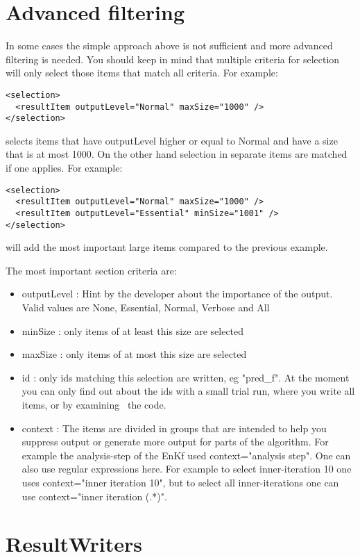 \section{Advanced filtering}

In some cases the simple approach above is not sufficient and more advanced
filtering is needed. You should keep in mind that multiple criteria for
selection will only select those items that match all criteria. For example:
\begin{verbatim}
<selection>
  <resultItem outputLevel="Normal" maxSize="1000" />
</selection>
\end{verbatim}
selects items that have outputLevel higher or equal to Normal and have a size
that is at most 1000. On the other hand selection in separate items are matched
if one applies. For example:
\begin{verbatim}
<selection>
  <resultItem outputLevel="Normal" maxSize="1000" />
  <resultItem outputLevel="Essential" minSize="1001" />
</selection>
\end{verbatim}
will add the most important large items compared to the previous example.

The most important section criteria are:
\begin{itemize}
\item outputLevel : Hint by the developer about the importance of the output.
Valid values are None, Essential, Normal, Verbose and All
\item minSize : only items of at least this size are selected
\item maxSize : only items of at most this size are selected
\item id : only ids matching this selection are written, eg "pred\_f". At the
moment you can only find out about the ids with a small trial run, where you
write all items, or by examining  the code.
\item context : The items are divided in groups that are intended to help you
suppress output or generate more output for parts of the algorithm. For example
the analysis-step of the EnKf used context="analysis step". One can also use
regular expressions here. For example to select inner-iteration 10 one uses
context="inner iteration 10", but to select all inner-iterations one can use
context="inner iteration (.*)".
\end{itemize}

\section{ResultWriters}

